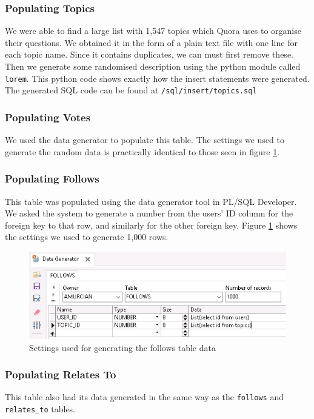 \subsubsection{Populating Topics}

We were able to find a large list with 1,547 topics which Quora uses to organise their questions. We obtained it in the form of a plain text file with one line for each topic name. Since it contains duplicates, we can must first remove these. Then we generate some randomised description using the python module called \verb`lorem`. This python code shows exactly how the insert statements were generated. The generated SQL code can be found at \verb`/sql/insert/topics.sql`


\subsubsection{Populating Votes}

We used the data generator to populate this table. The settings we used to generate the random data is practically identical to those seen in figure \ref{follows-generator}.

\subsubsection{Populating Follows}

This table was populated using the data generator tool in PL/SQL Developer. We asked the system to generate a number from the users' ID column for the foreign key to that row, and similarly for the other foreign key. Figure \ref{follows-generator} shows the settings we used to generate 1,000 rows.

\begin{figure}[htbp]
	\centering
	\includegraphics[width=\linewidth]{images/follows_generator.jpeg}
	\caption{Settings used for generating the follows table data}
	\label{follows-generator}
\end{figure}

\subsubsection{Populating Relates To}

This table also had its data generated in the same way as the \verb`follows` and \verb`relates_to` tables.